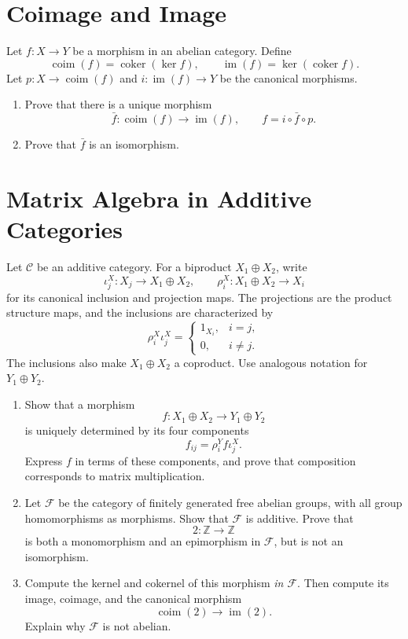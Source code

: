 \documentclass[11pt]{article}
\DeclareMathOperator{\im}{im}
\DeclareMathOperator{\coim}{coim}
\DeclareMathOperator{\coker}{coker}
\newcommand{\Z}{\mathbb{Z}}
\begin{document}
\section{Coimage and Image}
Let \(f:X\to Y\) be a morphism in an abelian category. Define
\[
\coim(f)=\coker(\ker f),
\qquad
\im(f)=\ker(\coker f).
\]
Let \(p:X\to\coim(f)\) and \(i:\im(f)\to Y\) be the canonical morphisms.
\begin{enumerate}
\item Prove that there is a unique morphism
\[
\bar{f}:\coim(f)\longrightarrow\im(f),
\qquad
f=i\circ\bar{f}\circ p.
\]
\item Prove that \(\bar{f}\) is an isomorphism.
\end{enumerate}

\section{Matrix Algebra in Additive Categories}
Let \(\mathcal C\) be an additive category. For a biproduct
\(X_1\oplus X_2\), write
\[
\iota_j^X:X_j\longrightarrow X_1\oplus X_2,
\qquad
\rho_i^X:X_1\oplus X_2\longrightarrow X_i
\]
for its canonical inclusion and projection maps. The projections are the
product structure maps, and the inclusions are characterized by
\[
\rho_i^X\iota_j^X=
\begin{cases}
1_{X_i},&i=j,\\
0,&i\ne j.
\end{cases}
\]
The inclusions also make \(X_1\oplus X_2\) a coproduct. Use analogous
notation for \(Y_1\oplus Y_2\).

\begin{enumerate}
\item Show that a morphism
\[
f:X_1\oplus X_2\longrightarrow Y_1\oplus Y_2
\]
is uniquely determined by its four components
\[
f_{ij}=\rho_i^Y f\iota_j^X.
\]
Express \(f\) in terms of these components, and prove that composition
corresponds to matrix multiplication.

\item Let \(\mathcal F\) be the category of finitely generated free
abelian groups, with all group homomorphisms as morphisms. Show that
\(\mathcal F\) is additive. Prove that
\[
2:\Z\longrightarrow\Z
\]
is both a monomorphism and an epimorphism in \(\mathcal F\), but is not
an isomorphism.

\item Compute the kernel and cokernel of this morphism \emph{in
\(\mathcal F\)}. Then compute its image, coimage, and the canonical morphism
\[
\coim(2)\longrightarrow\im(2).
\]
Explain why \(\mathcal F\) is not abelian.
\end{enumerate}
\end{document}
